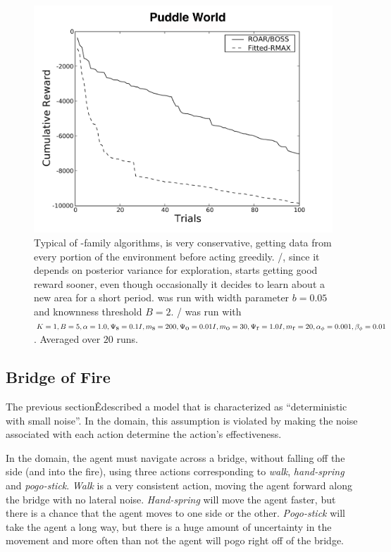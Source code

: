 \begin{figure}[t]
\vskip 0.2in
\begin{center}
\centerline{\includegraphics[width=\columnwidth]{puddleFigure}}
\caption{Typical of -family algorithms,  is very conservative, getting data from every portion of the environment before acting greedily. /, since it depends on posterior variance for exploration, starts getting good reward sooner, even though occasionally it decides to learn about a new area for a short period.  was run with width parameter $b=0.05$ and knownness threshold $B=2$. / was run with $K=1, B=5, \alpha=1.0,\Psi_{\mbox s}=0.1I, m_{\mbox s}=200, \Psi_{\mbox o}=0.01I, m_{\mbox o}=30, \Psi_{\mbox r}=1.0I,m_{\mbox r}=20,\alpha_\phi=0.001,\beta_\phi=0.01$. Averaged over $20$ runs.}
\label{fig:puddle}
\end{center}
\vskip -0.2in
\end{figure} 


\subsection{Bridge of Fire}
\label{fire}

The previous sectionÊdescribed a model that is characterized as ``deterministic with small noise''. In the  domain, this assumption is violated by making the noise associated with each action determine the action's effectiveness.

In the  domain, the agent must navigate across a bridge, without falling off the side (and into the fire), using three actions corresponding to \emph{walk}, \emph{hand-spring} and \emph{pogo-stick}. \emph{Walk} is a very consistent action, moving the agent forward along the bridge with no lateral noise. \emph{Hand-spring} will move the agent faster, but there is a chance that the agent moves to one side or the other. \emph{Pogo-stick} will take the agent a long way, but there is a huge amount of uncertainty in the movement and more often than not the agent will pogo right off of the bridge.

